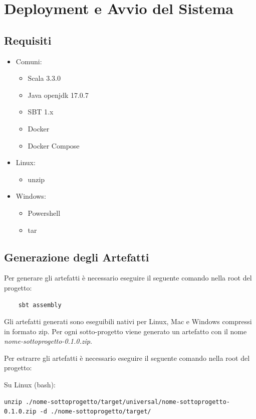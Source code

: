 \documentclass{scrartcl}
\begin{document}
\section{Deployment e Avvio del Sistema}

\subsection{Requisiti}
\begin{itemize}
    \item Comuni:
        \begin{itemize}
        \item Scala 3.3.0
        \item Java openjdk 17.0.7
        \item SBT 1.x
        \item Docker
        \item Docker Compose
        \end{itemize}
    \item Linux:
        \begin{itemize}
            \item unzip
        \end{itemize}
    \item Windows:
        \begin{itemize}
            \item Powershell
            \item tar
        \end{itemize}
\end{itemize}

\subsection{Generazione degli Artefatti}

Per generare gli artefatti è necessario eseguire il seguente comando nella root del progetto:

\begin{lstlisting}
    sbt assembly
\end{lstlisting}

Gli artefatti generati sono eseguibili nativi per Linux, Mac e Windows compressi in formato zip. Per ogni sotto-progetto viene generato un artefatto con il nome \textit{nome-sottoprogetto-0.1.0.zip}.

Per estrarre gli artefatti è necessario eseguire il seguente comando nella root del progetto:

Su Linux (bash):
\begin{lstlisting}
unzip ./nome-sottoprogetto/target/universal/nome-sottoprogetto-0.1.0.zip -d ./nome-sottoprogetto/target/
\end{lstlisting}
\end{document}
